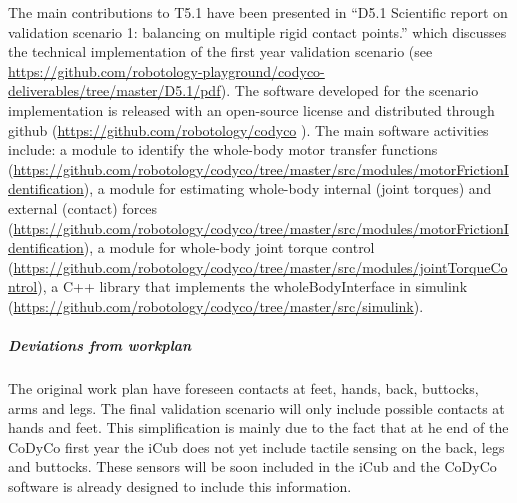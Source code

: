 \documentclass[12pt,a4paper,twoside]{article}
\begin{document}
The main contributions to T5.1 have been presented in ``D5.1 Scientific report on validation scenario 1: balancing on multiple rigid contact points.'' which discusses the technical implementation of the first year validation scenario (see \url{https://github.com/robotology-playground/codyco-deliverables/tree/master/D5.1/pdf}). The software developed for the scenario implementation is released with an open-source license and distributed through github (\url{https://github.com/robotology/codyco} ). The main software activities include: a module to identify the whole-body motor transfer functions (\url{https://github.com/robotology/codyco/tree/master/src/modules/motorFrictionIdentification}), a module for estimating whole-body internal (joint torques) and external (contact) forces (\url{https://github.com/robotology/codyco/tree/master/src/modules/motorFrictionIdentification}), a module for whole-body joint torque control (\url{https://github.com/robotology/codyco/tree/master/src/modules/jointTorqueControl}), a C++ library that implements the wholeBodyInterface in simulink (\url{https://github.com/robotology/codyco/tree/master/src/simulink}).

\subparagraph{Deviations from workplan}  

The original work plan have foreseen contacts at feet, hands, back, buttocks, arms and legs. The final validation scenario will only include possible contacts at hands and feet. This simplification is mainly due to the fact that at he end of the CoDyCo first year the iCub does not yet include tactile sensing on the back, legs and buttocks. These sensors will be soon included in the iCub and the CoDyCo software is already designed to include this information. 

\end{document}

